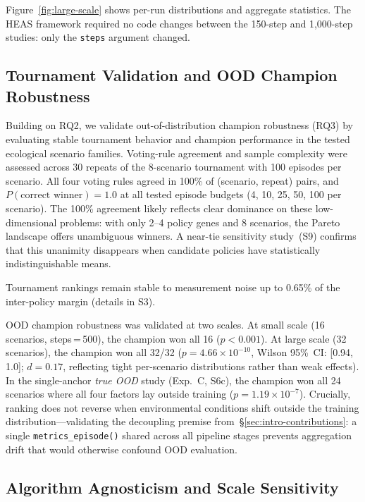\documentclass{wscpaperproc}
\begin{document}
Figure~\ref{fig:large-scale} shows per-run distributions and aggregate
statistics. The HEAS framework required no code changes between the 150-step
and 1,000-step studies: only the \texttt{steps} argument changed.

\subsection{Tournament Validation and OOD Champion Robustness}
\label{sec:tournament}

Building on RQ2, we validate out-of-distribution champion robustness (RQ3)
by evaluating stable tournament behavior and champion performance in the
tested ecological scenario families. Voting-rule agreement and sample complexity
were assessed across 30 repeats of
the 8-scenario tournament with 100 episodes per scenario. All four voting rules
agreed in 100\% of
(scenario, repeat) pairs, and $P(\text{correct winner})\!=\!1.0$ at all tested
episode budgets (4, 10, 25, 50, 100 per scenario). The 100\% agreement likely
reflects clear dominance on these low-dimensional problems: with only 2--4 policy
genes and 8 scenarios, the Pareto landscape offers unambiguous winners. A
near-tie sensitivity study~(S9) confirms that this unanimity disappears when
candidate policies have statistically indistinguishable means.

Tournament rankings remain stable to measurement noise up to 0.65\% of the inter-policy margin (details in S3).

OOD champion robustness was validated at two scales. At small scale (16
scenarios, steps\,=\,500), the champion won all 16 ($p\!<\!0.001$). At large
scale (32 scenarios), the champion won all 32/32 ($p\!=\!4.66\!\times\!10^{-10}$,
Wilson 95\%~CI: [0.94,\,1.0]; $d\!=\!0.17$, reflecting tight per-scenario
distributions rather than weak effects). In the single-anchor \emph{true OOD}
study (Exp.~C, S6c), the champion won all 24 scenarios where all four
factors lay outside training ($p\!=\!1.19\!\times\!10^{-7}$).
Crucially, ranking does not reverse when environmental conditions shift
outside the training distribution---validating the decoupling premise
from~\S\ref{sec:intro-contributions}: a single \texttt{metrics\_episode()}
shared across all pipeline stages prevents aggregation drift that would
otherwise confound OOD evaluation.


\subsection{Algorithm Agnosticism and Scale Sensitivity}
\label{sec:scale}
\end{document}
